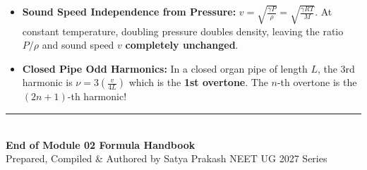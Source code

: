 \documentclass[11pt,a4paper]{article}
\begin{document}
\begin{trapbox}
\begin{itemize}
  \item \textbf{Sound Speed Independence from Pressure:} $v = \sqrt{\frac{\gamma P}{\rho}} = \sqrt{\frac{\gamma R T}{M}}$. At constant temperature, doubling pressure doubles density, leaving the ratio $P/\rho$ and sound speed $v$ \textbf{completely unchanged}.
  \item \textbf{Closed Pipe Odd Harmonics:} In a closed organ pipe of length $L$, the 3rd harmonic is $\nu = 3\left(\frac{v}{4L}\right)$ which is the \textbf{1st overtone}. The $n$-th overtone is the $(2n+1)$-th harmonic!
\end{itemize}
\end{trapbox}

\vspace{15pt}
\begin{center}
  \rule{0.6\textwidth}{0.8pt}\\[6pt]
  {\small\textbf{\color{primarydark}End of Module 02 Formula Handbook}}\\[2pt]
  {\footnotesize\color{accentblue}Prepared, Compiled \& Authored by Satya Prakash \quad\textbar\quad NEET UG 2027 Series}
\end{center}
\end{document}
